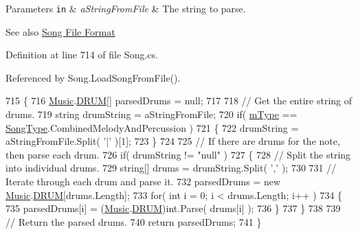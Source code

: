\begin{DoxyParams}[1]{Parameters}
\mbox{\tt in}  & {\em a\+String\+From\+File} & The string to parse. \\
\hline
\end{DoxyParams}
\begin{DoxySeeAlso}{See also}
\hyperlink{group___song_group_DocSongFileFormat}{Song File Format} 
\end{DoxySeeAlso}


Definition at line 714 of file Song.\+cs.



Referenced by Song.\+Load\+Song\+From\+File().


\begin{DoxyCode}
715     \{
716         \hyperlink{class_music}{Music}.\hyperlink{group___music_enums_gade475b4382c7066d1af13e7c13c029b6}{DRUM}[] parsedDrums = null;
717 
718         \textcolor{comment}{// Get the entire string of drums.}
719         \textcolor{keywordtype}{string} drumString = aStringFromFile;
720         \textcolor{keywordflow}{if}( \hyperlink{group___song_priv_var_gaf3b9d0f461522324f897b746311b43c5}{mType} == \hyperlink{group___song_enums_gae681a1f001333e39fc1cb4fea97bfe1b}{SongType}.CombinedMelodyAndPercussion )
721         \{
722             drumString = aStringFromFile.Split( \textcolor{charliteral}{'|'} )[1];
723         \}
724 
725         \textcolor{comment}{// If there are drums for the note, then parse each drum.}
726         \textcolor{keywordflow}{if}( drumString != \textcolor{stringliteral}{"null"} )
727         \{
728             \textcolor{comment}{// Split the string into individual drums.}
729             \textcolor{keywordtype}{string}[] drums = drumString.Split( \textcolor{charliteral}{','} );
730 
731             \textcolor{comment}{// Iterate through each drum and parse it.}
732             parsedDrums = \textcolor{keyword}{new} \hyperlink{class_music}{Music}.\hyperlink{group___music_enums_gade475b4382c7066d1af13e7c13c029b6}{DRUM}[drums.Length];
733             \textcolor{keywordflow}{for}( \textcolor{keywordtype}{int} i = 0; i < drums.Length; i++ )
734             \{
735                 parsedDrums[i] = (\hyperlink{class_music}{Music}.\hyperlink{group___music_enums_gade475b4382c7066d1af13e7c13c029b6}{DRUM})\textcolor{keywordtype}{int}.Parse( drums[i] );
736             \}
737         \}
738 
739         \textcolor{comment}{// Return the parsed drums.}
740         \textcolor{keywordflow}{return} parsedDrums;
741     \}
\end{DoxyCode}
\mbox{\label{group___song_priv_func_gacf6fee93921e1a5edbc477c0898c357a}} 
